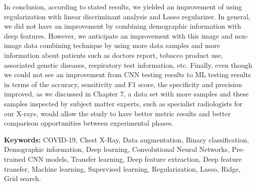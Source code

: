In conclusion, according to stated results, we yielded an improvement of using regularization with linear discriminant analysis and Lasso regularizer. In general, we did not have an improvement by combining demographic information with deep features. However, we anticipate an improvement with this image and non-image data combining technique by using more data samples and more information about patients such as doctors report, tobacco product use, associated genetic diseases, respiratory test information, etc. Finally, even though we could not see an improvement from CNN testing results to ML testing results in terms of the accuracy, sensitivity and F1 score, the specificity and precision improved, as we discussed in Chapter 7, a data set with more samples and these samples inspected by subject matter experts, such as specialist radiologists for our X-rays, would allow the study to have better metric results and better comparison opportunities between experimental phases.

\textbf{Keywords:} COVID-19, Chest X-Ray, Data augmentation, Binary classification, Demographic information, Deep learning, Convolutional Neural Networks, Pre-trained CNN models, Transfer learning, Deep feature extraction, Deep feature transfer, Machine learning, Supervised learning, Regularization, Lasso, Ridge, Grid search.